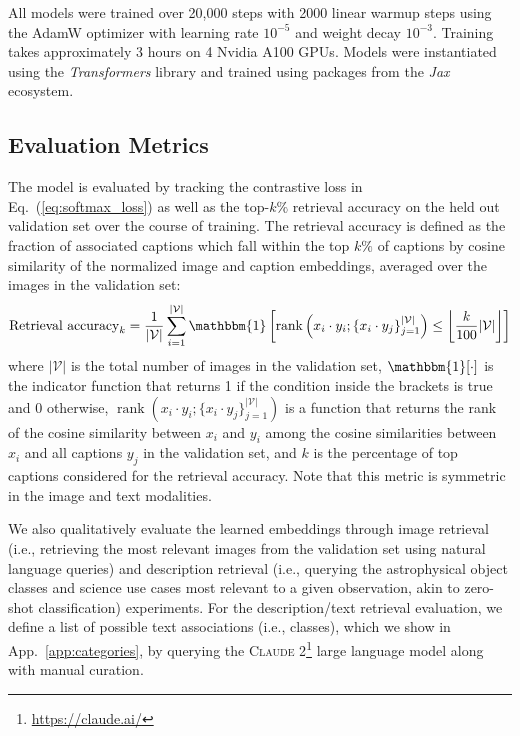 \documentclass[10pt]{article} %
\newcommand{\package}[1]{\textsl{#1}\xspace}
\newcommand{\eqrefb}[1]{(\ref{#1})}
\begin{document}
All models were trained over 20,000 steps with 2000 linear warmup steps 
using the AdamW optimizer \citep{DBLP:conf/iclr/LoshchilovH19,DBLP:journals/corr/KingmaB14} with  %
learning rate $10^{-5}$ and weight decay $10^{-3}$.
%
Training takes approximately 3 hours on 4 Nvidia A100 GPUs.
Models were instantiated using the \package{Transformers} \citep{wolf2019huggingface} library and trained using packages from the \package{Jax} \citep{jax2018github} ecosystem.
%


\subsection{Evaluation Metrics}
\label{sec:eval}

The model is evaluated by tracking the contrastive loss in Eq.~\eqrefb{eq:softmax_loss} as well as the top-$k\%$ retrieval accuracy on the held out validation set over the course of training.
%
The retrieval accuracy is defined as the fraction of associated captions which fall within the top $k\%$ of captions by cosine similarity of the normalized image and caption embeddings, averaged over the images in the validation set:
\begin{equation}
\text{Retrieval accuracy}_k = \frac{1}{|\mathcal V|} \sum_{i=1}^{|\mathcal V|} \mathbbm{1}\left[\operatorname{rank}\left({x}_i \cdot {y}_{i}; \{{x}_i \cdot {y}_{j}\}_{j=1}^{|\mathcal V|}\right) \leq \left\lfloor\frac{k}{100}|\mathcal V|\right\rfloor\right]
\label{eq:retrieval_accuracy}
\end{equation}
where $|\mathcal V|$ is the total number of images in the validation set, $\mathbbm{1}[\cdot]$ is the indicator function that returns 1 if the condition inside the brackets is true and 0 otherwise, $\operatorname{rank}\left({x}_i \cdot {y}_{i}; \{{x}_i \cdot {y}_{j}\}_{j=1}^{|\mathcal V|}\right)$ is a function that returns the rank of the cosine similarity between ${x}_i$ and ${y}_{i}$ among the cosine similarities between ${x}_i$ and all captions ${y}_j$ in the validation set, and $k$ is the percentage of top captions considered for the retrieval accuracy. Note that this metric is symmetric in the image and text modalities.

We also qualitatively evaluate the learned embeddings through image retrieval (i.e., retrieving the most relevant images from the validation set using natural language queries) and description retrieval (i.e., querying the astrophysical object classes and science use cases most relevant to a given observation, akin to zero-shot classification) experiments. 
%
For the description/text retrieval evaluation, we define a list of possible text associations (i.e., classes), which we show in App.~\ref{app:categories}, by querying the \textsc{Claude 2}\footnote{\url{https://claude.ai/}} large language model along with manual curation.
\end{document}
